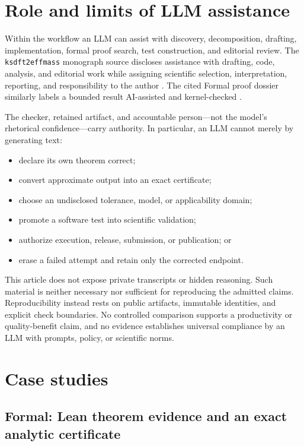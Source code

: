 \documentclass[11pt]{article}
\begin{document}
\section{Role and limits of LLM assistance}
\label{sec:llm}

Within the workflow an LLM can assist with discovery, decomposition, drafting,
implementation, formal proof search, test construction, and editorial review.
The \texttt{ksdft2effmass} monograph source discloses assistance with drafting,
code, analysis, and editorial work while assigning scientific selection,
interpretation, reporting, and responsibility to the author
\citep{ksdft2effmass_2026}. The cited Formal proof dossier similarly labels a
bounded result AI-assisted and kernel-checked \citep{projectkoios_formal_2026}.

The checker, retained artifact, and accountable person---not the model's
rhetorical confidence---carry authority. In particular, an LLM cannot merely by
generating text:

\begin{itemize}
  \item declare its own theorem correct;
  \item convert approximate output into an exact certificate;
  \item choose an undisclosed tolerance, model, or applicability domain;
  \item promote a software test into scientific validation;
  \item authorize execution, release, submission, or publication; or
  \item erase a failed attempt and retain only the corrected endpoint.
\end{itemize}

This article does not expose private transcripts or hidden reasoning. Such
material is neither necessary nor sufficient for reproducing the admitted
claims. Reproducibility instead rests on public artifacts, immutable identities,
and explicit check boundaries. No controlled comparison supports a productivity
or quality-benefit claim, and no evidence establishes universal compliance by
an LLM with prompts, policy, or scientific norms.

\section{Case studies}
\label{sec:cases}

\subsection{Formal: Lean theorem evidence and an exact analytic certificate}
\end{document}
